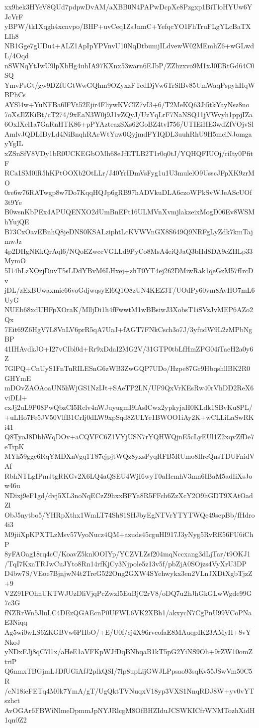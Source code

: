 xx9hek3HYeV8QUd7pdpwDvAM/aXBB0N4PAPwDcpXe8Pzgxp1BiTloHYUw6YJcVrF
yBPW/tk1Xqgh4xcnvpo/BHP+uvCeq1ZsJnmC+YefqcYO1FhTruFLgYLcBaTXLIh8
NB1Gge7gUDu4+ALZ1ApIpYPVnvU10NqDtbumjILdvewW02MEmhZ6+wGLwdL/4Oqd
nSWNqYtJwU9lpXbHg4uhIA97KXnx53warn6EJbP/ZZhzxvo9M1xJ0ERtGd64C0SQ
YmvPsGt/gw9DZfUGtWwGQhm9OZyxzFTedDjVw6TrSlBv85UmWaqPspyhHqWBPhCs
AYSl4w+YuNFBa6lFVt52Ejir4FliywKVClZ7vI3+6/T2MeKQ63Ji5tkYayNsz8no
7oXsJlZKiBt/cT274/9xEaN3W0j9J1vZQyJ/UzYqLrF7NaNSQ11jVWvyh1ppjIZa
6OxIXel1a7GaRnHTK86+pPYAzteazSXs62GoBZ4tvI756/UTIEiHE3wdZfVOjvSl
AmlvJQDLIDyLd4NiBnqhRAcWtYuw0QyjmdFYIQDL3uuhRhU9H5mciNJomgayYgIL
xZSnSfV8VDy1bR0UCKEGbOMh68eJfETLB2T1r0q0tJ/YQHQFIUOj/riIty0PfitF
RCa1SM0lR5hKPtOOXb2OtLLr/J40YrIDmVsFyg1u1U3mulelO9UsscJFpXK9zrMO
0re6w76RATwgp8w7Do7KqqHQJp6gRB97hADVkuDLA6czoWPkSvWJeAScUOf3t9Ye
B0wsnKbPEx4APUQENXO2dUmBnEFt16ULMVnXvmjlakzeixMogD06Ev8WSMhYujQE
B73CxOavEBnhQ8jeDNS0KSALziphtLcKVWVnGX8S649Q9NRFgLyZdk7kmTajmwJz
4p2DHgNKkQrAql6/NQoEZwccVGLLd9PyCo8MsA4eiQJaQ3bHd8DA9cZHLp33MymO
5I14bLzXOzjDuvT5sLDdYBvM6LHxej+zhT0YT4ej262DMiwRak1qeGzM57fIrcDv
jDL/zExBUwaxmic66voGdjwqsyEl6Q1O8zUN4KEZ3T/UOdPy60vm8AvHO7mL6UyG
NUEb68xdUHFpXOraK/MlljDi1h4fFwwtM1wBBsiwJ3XobsT1iSVzJvMEP6AZo2Qx
7Eit69Z6HgV7L8VnLV6prR5qA7UaJ+fAGT7FNkCsch3o7J/3yfudW9L2zMPbNgBP
41IHAvdkJO+I27vCIbl0d+Rr9xDdaI2MG2V/31GTP0tbLfHmZPG04iTaeH2a0y6Z
7GlPQ+CnUyS1FnTuRILESnG6zWB3ZwGQP7UDo/Hzpe87Gr9HbqshllBK2R0GHYmE
mDOvZAOAoaUN5hWjGS1NzIJt+SAeTP2LN/UF9QxVrKEsRw40rVhDD2ReX6viDLl+
cxJj2uL9P08PwQbzCI5Rclv4nWJuyugmI9lAsICwx2ypkyjaH0KLdk1SBvKu8PL/
+uLHo7Fe5JV50VlfB1CrIj0dLW9xpSqd8ZULYe1BWOO1iAy2K+wCLLiLaSwRKi41
Q8TyoJ8DbhWqDOv+aCQVFC6Z1VYjUSN7rYQHWQjnE5cLyEUl1Z2xqvZfDe7eTrpK
MYh59gge6RqYMDXnVgq1T87cjpjtWQz8yxsPyqRFB5RUmo8IlrcQnsTDUFnidVAf
RbhNTLgIPmJtgRKGv2X6LQ4aQSEU4WjI6wyT0aHcmhV3mn6IBaM5adIiXsJow46u
NDixj9eF1gd/dvj5XL3noNqECzZ9hxxBFYa8R5FFch6ZzXcY2O9hGDT9XAtOadZl
ObJ5nytbo5/YHRpXthx1WmLT74Sh81SHJbyEgNTVrYTYTWQe49sepBb/fHdro4i3
M9jiiXpKPXTLzMsv57VyoNucz4QM+azuds45cguHI917J3yNyg5RvRE56FU6iChP
8yFAOag18rq4cC/KoavZ5knlOOIYp/YCZVLZsf204mqNccxang3dLjTar/t9OKJ1
/TqI7KxaTRJwCuJYto8Rn14rfKjCy3Njpole5z13v5f/pbZjA0SOjzs4VyXrU3DP
D4bw7S/VEoe7BjnjwN4t2TreG522Ong2GXW4SYehwykx3en2VLnJXDtXgbTjzZ+9
V2Z91FOhnUKTWJUzDliVjqPcZwzI5EuBjC2rV8/oDQ7u2hJhGkGLwWgde99G7c3G
fNZRrWn5JluLC4DEzQGAEcnP0UFWL6VK2XBh1/akxycN7CgPnU99VCoPNaE3Niqq
Ag5wi0wLS6ZKGBVw6PHbO/+E/U0f/cj4X96rveofaE8MAuqpIK23AMyH+8vYNkoJ
yNDxFJj8qC7l1x/aHeE1aVFKpWJfDqBNbqaB1kT5pG2YiNS9Oh+9rZW10omZtriP
Q6nmxTBGjmLJDfUGiAfJ2plkQSI/7lp8upLijGWJLPpsao93sqKv55JSwVm50C5R
/cN18ieFETq4M0k7YmA/gT/UgQktTVNuqxV18yp3VXS1NnqRDJ8W+yv0vYTszhct
AvOGAr6FBWiNlmeDpmmJpNYJRlcgM8OfBHZIduJCSWKICfrWNMTozhXidH1qn0Z2
